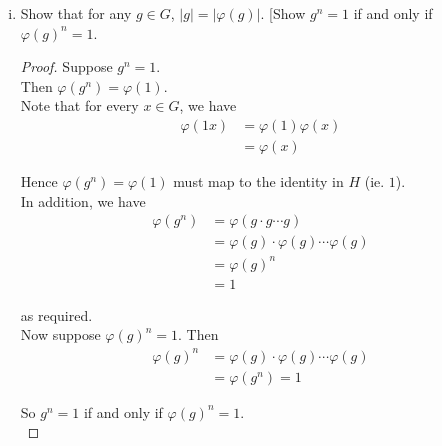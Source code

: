 \documentclass[11pt, reqno]{amsart}
\theoremstyle{plain}
\theoremstyle{definition}
\theoremstyle{example}
\begin{document}
\begin{enumerate}[1.]
\begin{enumerate}[(a)]
\begin{enumerate}[(i)]
\begin{proof}
for every $x, y \in G$. Since $\varphi$ is a bijection, for every element $y \in H$, $\exists x_y \in G$ such that $\varphi(x_y) = y$. Hence, this shows that $H$ is an abelian group as well.\\

Now suppose $H$ is abelian. Consider $\varphi^{-1}$, which is a bijection from $H \to G$ and a homomorphism (hence an isomorphism). Then we can apply the same argument as above, just swapping the $H$ and $G$.\\

Hence, $H$ abelian $\implies G$ abelian, and we get $G$ abelian $\iff H$ abelian.

\end{proof}

\item Show that for any $g \in G$, $|g| = |\varphi(g)|$. [Show $g^n = 1$ if and only if $\varphi(g)^n = 1$.

\begin{proof}
Suppose $g^n = 1$.\\

Then $\varphi(g^n) = \varphi(1)$.\\

Note that for every $x \in G$, we have
\begin{align*}
\varphi(1x) &= \varphi(1)\varphi(x)\\
&= \varphi(x)
\end{align*}

Hence $\varphi(g^n) = \varphi(1)$ must map to the identity in $H$ (ie. $1$).\\

In addition, we have
\begin{align*}
\varphi(g^n) &= \varphi(g \cdot g \cdots g)\\
&= \varphi(g) \cdot \varphi(g) \cdots \varphi(g)\\
&= \varphi(g)^n\\
&= 1
\end{align*}

as required.\\

Now suppose $\varphi(g)^n = 1$. Then
\begin{align*}
\varphi(g)^n &= \varphi(g) \cdot \varphi(g) \cdots \varphi(g)\\
&= \varphi(g^n) = 1
\end{align*}

So $g^n = 1$ if and only if $\varphi(g)^n = 1$.\\


\end{proof}
\end{enumerate}
\end{enumerate}
\end{enumerate}
\end{document}
